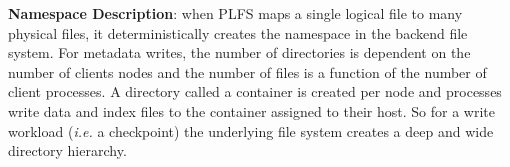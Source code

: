 



\textbf{Namespace Description}: when PLFS maps a single logical file to many
physical files, it deterministically creates the namespace in the backend file
system.  For metadata writes, the number of directories is dependent on the
number of clients nodes and the number of files is a function of the number of
client processes.  A directory called a container is created per node and
processes write data and index files to the container assigned to their host.
So for a write workload ({\it i.e.} a checkpoint) the underlying file system
creates a deep and wide directory hierarchy.

